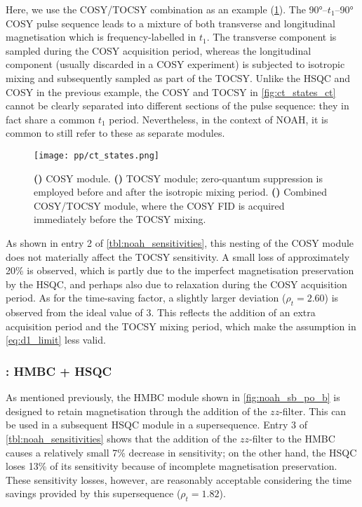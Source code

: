 Here, we use the COSY/TOCSY combination\autocite{Nolis2019MRC} as an example (\cref{fig:ct_states}).
The \ang{90}--$t_1$--\ang{90} COSY pulse sequence leads to a mixture of both transverse and longitudinal magnetisation which is frequency-labelled in $t_1$.
The transverse component is sampled during the COSY acquisition period, whereas the longitudinal component (usually discarded in a COSY experiment) is subjected to isotropic mixing and subsequently sampled as part of the TOCSY.
Unlike the HSQC and COSY in the previous example, the COSY and TOCSY in \cref{fig:ct_states_ct} cannot be clearly separated into different sections of the pulse sequence: they in fact share a common $t_1$ period.
Nevertheless, in the context of NOAH, it is common to still refer to these as separate modules.

\begin{figure}[!ht]
    \centering
    \texttt{[image: pp/ct\_states.png]}%
    {\label{fig:ct_states_c}}%
    {\label{fig:ct_states_t}}%
    {\label{fig:ct_states_ct}}%
    \caption[COSY/TOCSY NOAH module]{
        \textbf{()} COSY module.
        \textbf{()} TOCSY module; zero-quantum suppression is employed before and after the isotropic mixing period.
        \textbf{()} Combined COSY/TOCSY module, where the COSY FID is acquired immediately before the TOCSY mixing.
    }
    \label{fig:ct_states}
\end{figure}

As shown in entry 2 of \cref{tbl:noah_sensitivities}, this nesting of the COSY module does not materially affect the TOCSY sensitivity.
A small loss of approximately 20\% is observed, which is partly due to the imperfect magnetisation preservation by the HSQC, and perhaps also due to relaxation during the COSY acquisition period.
As for the time-saving factor, a slightly larger deviation ($\rho_t = 2.60$) is observed from the ideal value of $3$.
This reflects the addition of an extra acquisition period and the TOCSY mixing period, which make the assumption in \cref{eq:d1_limit} less valid.

\subsubsection{: HMBC + HSQC}

As mentioned previously, the HMBC module shown in \cref{fig:noah_sb_po_b} is designed to retain  magnetisation through the addition of the $zz$-filter.
This can be used in a subsequent HSQC module in a  supersequence.
Entry 3 of \cref{tbl:noah_sensitivities} shows that the addition of the $zz$-filter to the HMBC causes a relatively small 7\% decrease in sensitivity; on the other hand, the HSQC loses 13\% of its sensitivity because of incomplete magnetisation preservation.
These sensitivity losses, however, are reasonably acceptable considering the time savings provided by this supersequence ($\rho_t = 1.82$).


